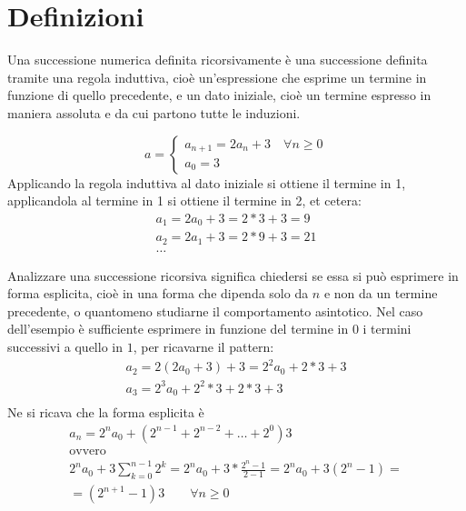 %
%
%
%


\section{Definizioni}
Una successione numerica definita ricorsivamente è una successione definita tramite una regola induttiva, cioè un'espressione che esprime un termine in funzione di quello precedente, e un dato iniziale, cioè un termine espresso in maniera assoluta e da cui partono tutte le induzioni.
\begin{examp}
	\[
		a=
		\begin{cases}
			a_{n+1}=2a_n+3 \quad \forall n \geq 0 \\
			a_0=3
		\end{cases}
	\]
	Applicando la regola induttiva al dato iniziale si ottiene il termine in 1, applicandola al termine in 1 si ottiene il termine in 2, et cetera:
	\begin{gather*}
		a_1=2a_0+3=2*3+3=9\\
		a_2=2a_1+3=2*9+3=21\\
		\dots
	\end{gather*}
\end{examp}
Analizzare una successione ricorsiva significa chiedersi se essa si può esprimere in forma esplicita, cioè in una forma che dipenda solo da $n$ e non da un termine precedente, o quantomeno studiarne il comportamento asintotico. Nel caso dell'esempio è sufficiente esprimere in funzione del termine in $0$ i termini successivi a quello in $1$, per ricavarne il pattern:
\begin{gather*}
	a_2=2(2a_0+3)+3=2^2a_0+2*3+3\\
	a_3=2^3a_0+2^2*3+2*3+3\\
\end{gather*}
Ne si ricava che la forma esplicita è
\begin{gather*}
	a_n=2^na_0+(2^{n-1}+2^{n-2}+\dots+2^0)3\\
	\text{ovvero}\\
	2^na_0+3\sum_{k=0}^{n-1} 2^k=2^na_0+3*\frac{2^n-1}{2-1}=2^na_0+3(2^n-1)=\\
	=(2^{n+1}-1)3 \qquad \forall n \geq 0
\end{gather*}
